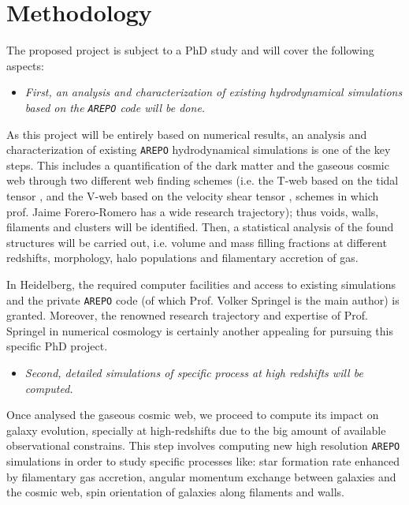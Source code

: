 \documentclass[a4,useAMS,usenatbib,usegraphicx,12pt]{article}
\begin{document}
\section{Methodology}


The proposed project is subject to a PhD study and will cover the following 
aspects:


\begin{itemize}

\item[\checkmark] \textit{First, an analysis and characterization of existing 
hydrodynamical simulations based on the \texttt{AREPO} code will be done.}

\end{itemize}


As this project will be entirely based on numerical results, an analysis and 
characterization of existing \texttt{AREPO} hydrodynamical simulations is one 
of the key steps. This includes a quantification of the dark matter and the 
gaseous cosmic web through two different web finding schemes (i.e. the T-web 
based on the tidal tensor \citep{Hahn07,Forero09}, and the V-web based on the 
velocity shear tensor \citep{Hoffman12}, schemes in which prof. Jaime 
Forero-Romero has a wide research trajectory); thus voids, walls, filaments 
and clusters will be identified. Then, a statistical analysis of the found 
structures will be carried out, i.e. volume and mass filling fractions at 
different redshifts, morphology, halo populations and filamentary accretion of 
gas.


In Heidelberg, the required computer facilities and access to existing 
simulations and the private \texttt{AREPO} code (of which Prof. Volker 
Springel is the main author) is granted. Moreover, the renowned research 
trajectory and expertise of Prof. Springel in numerical cosmology is 
certainly another appealing for pursuing this specific PhD project.


\begin{itemize}

\item[\checkmark] \textit{Second, detailed simulations of specific process at
high redshifts will be computed.}

\end{itemize}


Once analysed the gaseous cosmic web, we proceed to compute its impact on 
galaxy evolution, specially at high-redshifts due to the big amount of 
available observational constrains. This step involves computing new high 
resolution \texttt{AREPO} simulations in order to study specific processes 
like: star formation rate enhanced by filamentary gas accretion, angular 
momentum exchange between galaxies and the cosmic web, spin orientation of 
galaxies along filaments and walls.
\end{document}
